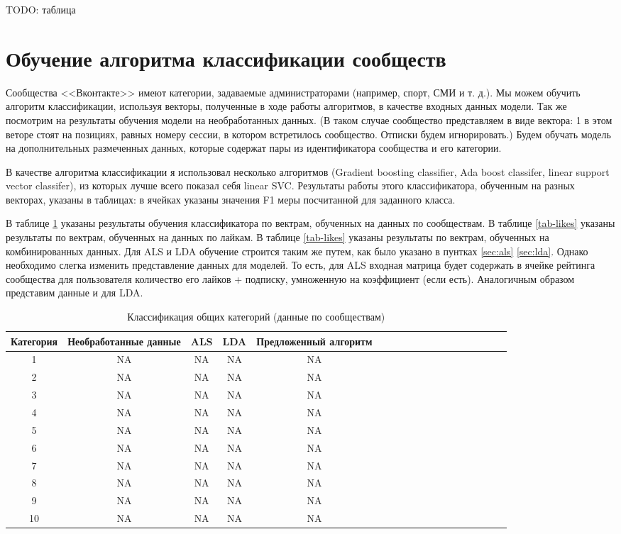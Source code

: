 \documentclass[times,specification,annotation]{itmo-student-thesis}
\begin{document}
TODO: таблица

\section{Обучение алгоритма классификации сообществ}

Сообщества <<Вконтакте>> имеют категории, задаваемые администраторами
(например, спорт, СМИ и т. д.). Мы можем обучить алгоритм классификации,
используя векторы, полученные в ходе работы алгоритмов, в качестве входных
данных модели. Так же посмотрим на результаты обучения модели на необработанных данных. (В таком случае сообщество представляем в виде вектора: 1 в этом веторе стоят на позициях, равных номеру сессии, в котором встретилось сообщество. Отписки будем игнорировать.)  
Будем обучать модель на дополнительных размеченных данных,
которые содержат пары из идентификатора сообщества и его категории.

В качестве алгоритма классификации я использовал несколько алгоритмов (Gradient boosting classifier, Ada boost classifer, linear support vector classifer), из которых лучше всего показал себя linear SVC. Результаты работы этого классификатора, обученным на разных векторах, указаны в таблицах: в ячейках указаны значения F1 меры посчитанной для заданного класса. 

В таблице \ref{tab-subs} указаны результаты обучения классификатора по вектрам, обученных на данных по сообществам. В таблице \ref{tab-likes} указаны результаты по вектрам, обученных на данных по лайкам. В таблице \ref{tab-likes} указаны результаты по вектрам, обученных на комбинированных данных. Для ALS и LDA обучение строится таким же путем, как было указано в пунтках \ref{sec:als} \ref{sec:lda}. Однако необходимо слегка изменить представление данных для моделей. То есть, для ALS входная матрица будет содержать в ячейке рейтинга сообщества для пользователя количество его лайков + подписку, умноженную на коэффициент (если есть). Аналогичным образом представим данные и для LDA.  

\begin{table}[!h]
\caption{Классификация общих категорий (данные по сообществам)}\label{tab-subs}
\centering
\begin{tabular}{|*{18}{c|}}\hline
Категория & Необработанные данные & ALS & LDA & Предложенный алгоритм \\\hline
1  & NA & NA & NA & NA  \\\hline
2  & NA & NA & NA & NA \\\hline
3  & NA & NA & NA & NA \\\hline
4  & NA & NA & NA & NA \\\hline
5  & NA & NA & NA & NA  \\\hline
6  & NA & NA & NA & NA \\\hline
7  & NA & NA & NA & NA \\\hline
8  & NA & NA & NA & NA \\\hline
9  & NA & NA & NA & NA  \\\hline
10  & NA & NA & NA & NA \\\hline
\end{tabular}
\end{table}
\end{document}
